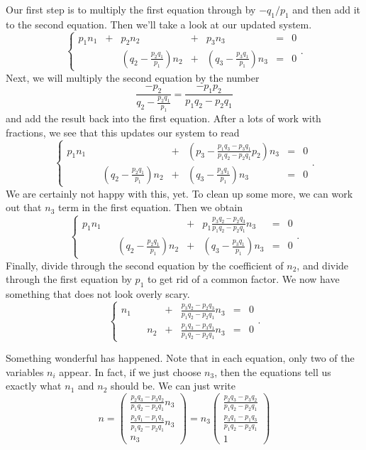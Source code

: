 \documentclass[00-livre-main.tex]{subfiles}
\begin{document}
Our first step is to multiply the first equation through by $-q_1/p_1$ and then add it to the second equation. Then we'll take a look at our updated system.
\[
\left\{ \begin{array}{rrrrrrr}
p_1 n_1 & + & p_2 n_2 & + & p_3 n_3 & = & 0 \\
& &\left(q_2-\frac{p_2q_1}{p_1}\right) n_2 & + & \left(q_3-\frac{p_3q_1}{p_1}\right) n_3 & = & 0 
\end{array}\right. .
\]
Next, we will multiply the second equation by the number 
\[
\frac{-p_2}{q_2 - \frac{p_2q_1}{p_1}} = \frac{-p_1p_2}{p_1q_2 - p_2q_1}
\] 
and add the result back into the first equation. After a lots of work with fractions, we see that this updates our system to read
\[
\left\{ \begin{array}{rrrrrrr}
p_1 n_1 &  &  & + & \left(p_3 -\frac{p_1q_3-p_3q_1}{p_1q_2 - p_2q_1}p_2  \right) n_3 & = & 0 \\
& &\left(q_2-\frac{p_2q_1}{p_1}\right) n_2 & + & \left(q_3-\frac{p_3q_1}{p_1}\right) n_3 & = & 0 
\end{array}\right. .
\]
We are certainly not happy with this, yet. To clean up some more, we can work out that $n_3$ term in the first equation. Then we obtain
\[
\left\{ \begin{array}{rrrrrrr}
p_1 n_1 &  &  & + & p_1\frac{p_3q_2 - p_2q_3}{p_1q_2-p_2q_1} n_3 & = & 0 \\
& &\left(q_2-\frac{p_2q_1}{p_1}\right) n_2 & + & \left(q_3-\frac{p_3q_1}{p_1}\right) n_3 & = & 0
\end{array}\right. .
\]
Finally, divide through the second equation by the coefficient of $n_2$, and divide through the first equation by $p_1$ to get rid of a common factor. We now have something that does not look overly scary.
\[
\left\{ \begin{array}{rrrrrrr}
n_1 &  &  & + & \frac{p_3q_2 - p_2q_3}{p_1q_2-p_2q_1} n_3 & = & 0 \\
& & n_2 & + & \frac{p_1q_3-p_3q_1}{p_1q_2-p_2q_1} n_3 & = & 0 
\end{array}\right. .
\]



Something wonderful has happened. Note that in each equation, only two of the variables $n_i$ appear. In fact, if we just choose $n_3$, then the equations tell us exactly what $n_1$ and $n_2$ should be. We can just write
\[
n = \begin{pmatrix}  \frac{p_2q_3 - p_3q_2}{p_1q_2-p_2q_1} n_3\\ \frac{p_3q_1-p_1q_3}{p_1q_2-p_2q_1} n_3\\ n_3 \end{pmatrix} = n_3 \begin{pmatrix}  \frac{p_2q_3 - p_3q_2}{p_1q_2-p_2q_1} \\ \frac{p_3q_1-p_1q_3}{p_1q_2-p_2q_1} \\ 1 \end{pmatrix}
\]
\end{document}
